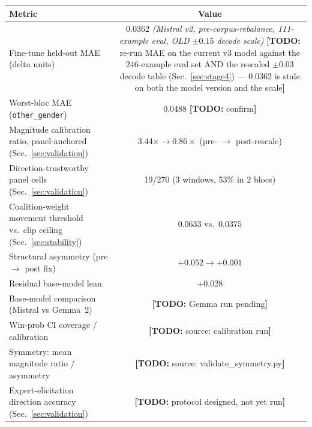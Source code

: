 \documentclass[11pt]{article}
\newcommand{\todo}[1]{{\color{red}\textbf{[TODO:} #1\textbf{]}}}
\begin{document}
\begin{center}
\begin{tabular}{lc}
\toprule
Metric & Value \\
\midrule
Fine-tune held-out MAE (delta units) & 0.0362 \emph{(Mistral v2, pre-corpus-rebalance,
111-example eval, OLD $\pm0.15$ decode scale)} \todo{re-run MAE on the current
v3 model against the 246-example eval set AND the rescaled $\pm0.03$ decode
table (Sec.~\ref{sec:stage4}) --- 0.0362 is stale on both the model version
and the scale}\\
Worst-bloc MAE (\texttt{other\_gender}) & 0.0488 \todo{confirm}\\
Magnitude calibration ratio, panel-anchored (Sec.~\ref{sec:validation}) &
$3.44\times \rightarrow 0.86\times$ (pre- $\rightarrow$ post-rescale)\\
Direction-trustworthy panel cells (Sec.~\ref{sec:validation}) & 19/270
(3 windows, 53\% in 2 blocs)\\
Coalition-weight movement threshold vs.\ clip ceiling (Sec.~\ref{sec:stability})
& $0.0633$ vs.\ $0.0375$\\
Structural asymmetry (pre $\rightarrow$ post fix) & $+0.052 \rightarrow +0.001$\\
Residual base-model lean & $+0.028$\\
Base-model comparison (Mistral vs Gemma~2) & \todo{Gemma run pending}\\
Win-prob CI coverage / calibration & \todo{source: calibration run}\\
Symmetry: mean magnitude ratio / asymmetry & \todo{source: validate\_symmetry.py}\\
Expert-elicitation direction accuracy (Sec.~\ref{sec:validation}) &
\todo{protocol designed, not yet run}\\
\bottomrule
\end{tabular}
\end{center}
\end{document}

